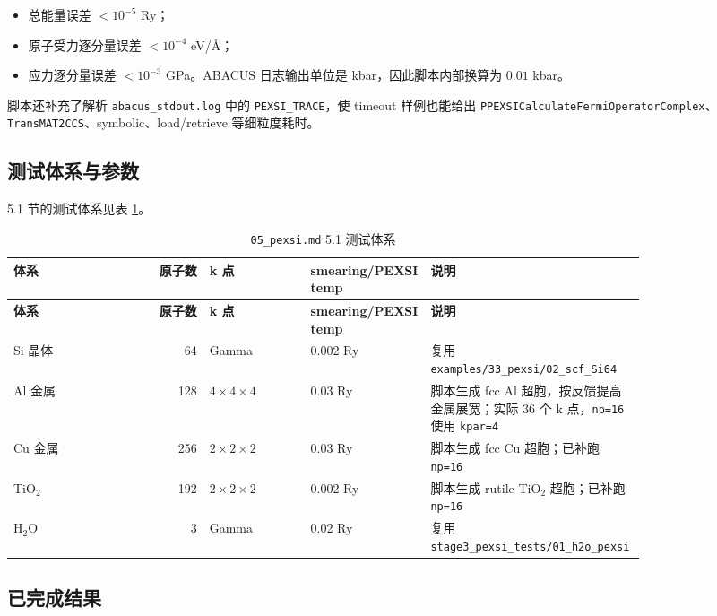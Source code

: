 \documentclass[a4paper,11pt]{article}
\newcommand{\code}[1]{\texttt{#1}}
\begin{document}
\begin{itemize}
    \item 总能量误差 \(<10^{-5}\) Ry；
    \item 原子受力逐分量误差 \(<10^{-4}\) eV/\AA；
    \item 应力逐分量误差 \(<10^{-3}\) GPa。ABACUS 日志输出单位是 kbar，因此脚本内部换算为 \(0.01\) kbar。
\end{itemize}

脚本还补充了解析 \code{abacus\_stdout.log} 中的 \code{PEXSI\_TRACE}，使 timeout 样例也能给出 \code{PPEXSICalculateFermiOperatorComplex}、\code{TransMAT2CCS}、symbolic、load/retrieve 等细粒度耗时。

\subsection{测试体系与参数}

5.1 节的测试体系见表 \ref{tab:sec51-systems}。

{\scriptsize
\begin{longtable}{@{}p{0.16\linewidth}r p{0.16\linewidth}p{0.16\linewidth}p{0.34\linewidth}@{}}
\caption{\code{05\_pexsi.md} 5.1 测试体系}
\label{tab:sec51-systems}\\
\toprule
\textbf{体系} & \textbf{原子数} & \textbf{k 点} & \textbf{smearing/PEXSI temp} & \textbf{说明}\\
\midrule
\endfirsthead
\toprule
\textbf{体系} & \textbf{原子数} & \textbf{k 点} & \textbf{smearing/PEXSI temp} & \textbf{说明}\\
\midrule
\endhead
Si 晶体 & 64 & Gamma & 0.002 Ry & 复用 \code{examples/33\_pexsi/02\_scf\_Si64}\\
Al 金属 & 128 & \(4\times4\times4\) & 0.03 Ry & 脚本生成 fcc Al 超胞，按反馈提高金属展宽；实际 36 个 k 点，\code{np=16} 使用 \code{kpar=4}\\
Cu 金属 & 256 & \(2\times2\times2\) & 0.03 Ry & 脚本生成 fcc Cu 超胞；已补跑 \code{np=16}\\
TiO\(_2\) & 192 & \(2\times2\times2\) & 0.002 Ry & 脚本生成 rutile TiO\(_2\) 超胞；已补跑 \code{np=16}\\
H\(_2\)O & 3 & Gamma & 0.02 Ry & 复用 \code{stage3\_pexsi\_tests/01\_h2o\_pexsi}\\
\bottomrule
\end{longtable}
}

\subsection{已完成结果}
\end{document}
